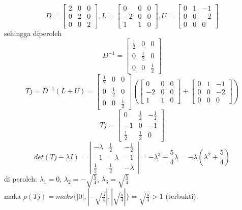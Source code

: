 \documentclass[paper=a4, fontsize=11pt]{scrartcl}
\numberwithin{equation}{section} %
\numberwithin{figure}{section} %
\numberwithin{table}{section} %
\begin{document}
\[ 
D = 
\begin{bmatrix}
  2 & 0 & 0 \\
  0 & 2 & 0 \\
  0 & 0 & 2
 \end{bmatrix}
,
L = 
\begin{bmatrix}
  0 & 0 & 0 \\
 -2 & 0 & 0 \\
  1 & 1 & 0
 \end{bmatrix}
, 
U = 
\begin{bmatrix}
  0 & 1 & -1 \\
  0 & 0 & -2 \\
  0 & 0 &  0
 \end{bmatrix}
\]
sehingga diperoleh
\[
D^{-1} =
\begin{bmatrix}
  \frac{1}{2} & 0 & 0 \\
  0 & \frac{1}{2} & 0 \\
  0 & 0 & \frac{1}{2}
 \end{bmatrix}
\]
\[
Tj = D^{-1}(L + U) = 
\begin{bmatrix}
  \frac{1}{2} & 0 & 0 \\
  0 & \frac{1}{2} & 0 \\
  0 & 0 & \frac{1}{2}
\end{bmatrix}
\left(
\begin{bmatrix}
  0 & 0 & 0 \\
 -2 & 0 & 0 \\
  1 & 1 & 0
 \end{bmatrix}
+
\begin{bmatrix}
  0 & 1 & -1 \\
  0 & 0 & -2 \\
  0 & 0 &  0
 \end{bmatrix}
\right)
\]
\[
Tj = 
\begin{bmatrix}
  0 & \frac{1}{2} & -\frac{1}{2} \\
  -1 & 0 & -1 \\
  \frac{1}{2} & \frac{1}{2} & 0
\end{bmatrix}
\]
\[
det(Tj - \lambda I) =
\left| 
\begin{array}{ccc}
  -\lambda & \frac{1}{2} & -\frac{1}{2} \\
  -1 & -\lambda & -1 \\
  \frac{1}{2} & \frac{1}{2} & -\lambda 
\end{array} 
\right|
= -\lambda^{3} - \frac{5}{4}\lambda = -\lambda (\lambda^{2} + \frac{5}{4})
\]
di peroleh: $\lambda_{1} = 0$, $\lambda_{2} = -\sqrt{\frac{5}{4}}$, $\lambda_{3} = \sqrt{\frac{5}{4}}$\\
maka $\rho(Tj) = maks\lbrace \left| 0 \right|, \left| -\sqrt{\frac{5}{4}} \right|, \left| \sqrt{\frac{5}{4}} \right| \rbrace = \sqrt{\frac{5}{4}} > 1 $ (terbukti).\\
\end{document}
